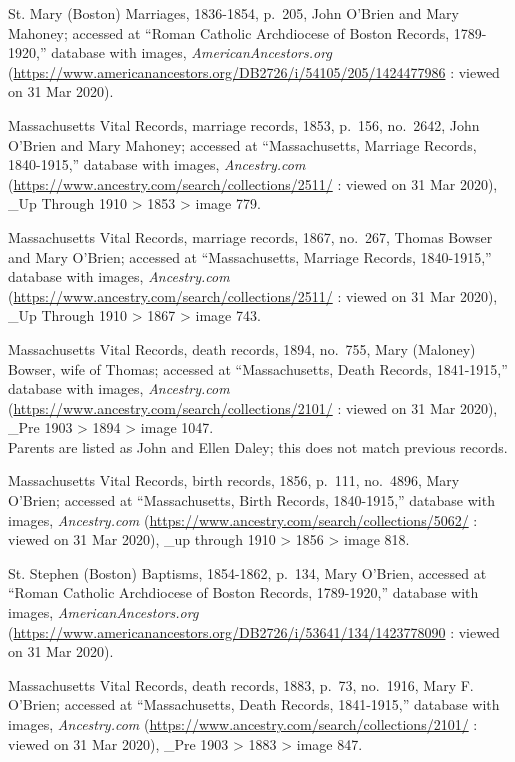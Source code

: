 \begin{thebibliography}{999}
	St. Mary (Boston) Marriages, 1836-1854, p.\ 205, John O'Brien and Mary Mahoney; accessed at ``Roman Catholic Archdiocese of Boston Records, 1789-1920,'' database with images, \textit{AmericanAncestors.org} (\url{https://www.americanancestors.org/DB2726/i/54105/205/1424477986} : viewed on 31 Mar 2020).
	
	Massachusetts Vital Records, marriage records, 1853, p.\ 156, no.\ 2642, John O'Brien and Mary Mahoney; accessed at ``Massachusetts, Marriage Records, 1840-1915,'' database with images, \textit{Ancestry.com} (\url{https://www.ancestry.com/search/collections/2511/} : viewed on 31 Mar 2020), \_Up Through 1910 > 1853 > image 779.
	
	Massachusetts Vital Records, marriage records, 1867, no.\ 267, Thomas Bowser and Mary O'Brien; accessed at ``Massachusetts, Marriage Records, 1840-1915,'' database with images, \textit{Ancestry.com} (\url{https://www.ancestry.com/search/collections/2511/} : viewed on 31 Mar 2020), \_Up Through 1910 > 1867 > image 743.
	
	Massachusetts Vital Records, death records, 1894, no.\ 755, Mary (Maloney) Bowser, wife of Thomas; accessed at ``Massachusetts, Death Records, 1841-1915,'' database with images, \textit{Ancestry.com} (\url{https://www.ancestry.com/search/collections/2101/} : viewed on 31 Mar 2020), \_Pre 1903 > 1894 > image 1047.\\
	Parents are listed as John and Ellen Daley; this does not match previous records.
	
	Massachusetts Vital Records, birth records, 1856, p.\ 111, no.\ 4896, Mary O'Brien; accessed at ``Massachusetts, Birth Records, 1840-1915,'' database with images, \textit{Ancestry.com} (\url{https://www.ancestry.com/search/collections/5062/} : viewed on 31 Mar 2020), \_up through 1910 > 1856 > image 818.
	
	St. Stephen (Boston) Baptisms, 1854-1862, p.\ 134, Mary O'Brien, accessed at ``Roman Catholic Archdiocese of Boston Records, 1789-1920,'' database with images, \textit{AmericanAncestors.org} (\url{https://www.americanancestors.org/DB2726/i/53641/134/1423778090} : viewed on 31 Mar 2020).
	
	Massachusetts Vital Records, death records, 1883, p.\ 73, no.\ 1916, Mary F. O'Brien; accessed at ``Massachusetts, Death Records, 1841-1915,'' database with images, \textit{Ancestry.com} (\url{https://www.ancestry.com/search/collections/2101/} : viewed on 31 Mar 2020), \_Pre 1903 > 1883 > image 847.
	

\end{thebibliography}
